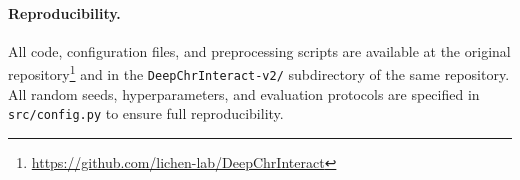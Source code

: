 \paragraph{Reproducibility.}
All code, configuration files, and preprocessing scripts are available at
the original repository\footnote{\url{https://github.com/lichen-lab/DeepChrInteract}}
and in the \texttt{DeepChrInteract-v2/} subdirectory of the same repository.
All random seeds, hyperparameters, and evaluation protocols are specified in
\texttt{src/config.py} to ensure full reproducibility.
